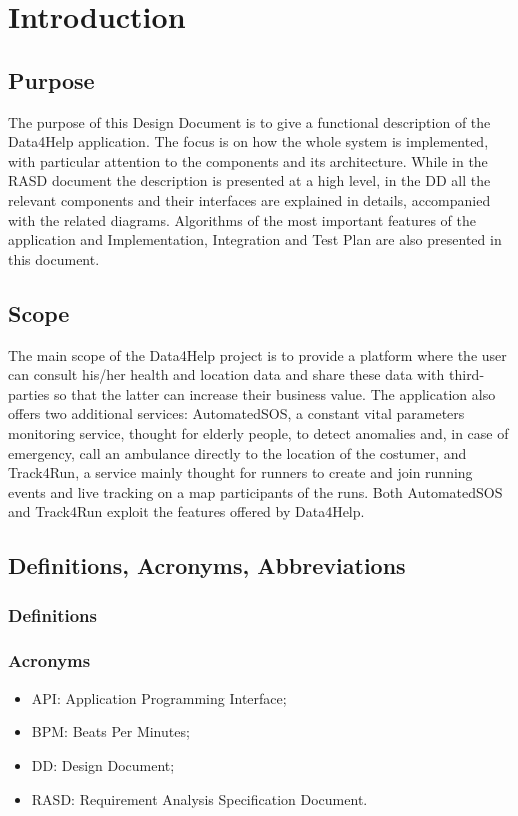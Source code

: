 \documentclass[DD.tex]{subfiles}
\begin{document}
\section{Introduction}

\subsection{Purpose}
The purpose of this Design Document is to give a functional description of the Data4Help application. The focus is on how the whole system is implemented, with particular attention to the components and its architecture. \newline
While in the RASD document the description is presented at a high level, in the DD all the relevant components and their interfaces are explained in details, accompanied with the related diagrams.
Algorithms of the most important features of the application and Implementation, Integration and Test Plan are also presented in this document. 

\subsection{Scope}
The main scope of the Data4Help project is to provide a platform where the user can consult his/her health and location data and share these data with third-parties so that the latter can increase their business value. \newline
The application also offers two additional services: AutomatedSOS, a constant vital parameters monitoring service, thought for elderly people, to detect anomalies and, in case of emergency, call an ambulance directly to the location of the costumer, and Track4Run, a service mainly thought for runners to create and join running events and live tracking on a map participants of the runs. \newline
Both AutomatedSOS and Track4Run exploit the features offered by Data4Help.

\subsection{Definitions, Acronyms, Abbreviations}

\subsubsection{Definitions}

\subsubsection{Acronyms}
\begin{itemize}
	\item API: Application Programming Interface;
	\item BPM: Beats Per Minutes;
	\item DD: Design Document;
	\item RASD: Requirement Analysis Specification Document.
\end{itemize}
\end{document}
